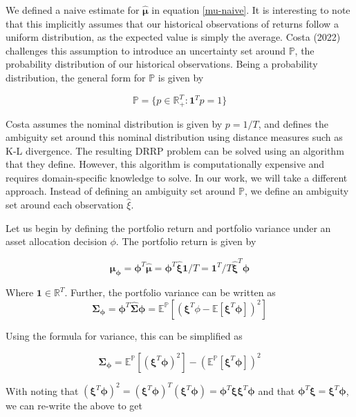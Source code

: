 \documentclass[12pt]{article}
\begin{document}
We defined a naive estimate for $\boldsymbol{\hat{\mu}}$ in equation \ref{mu-naive}. It is interesting to note that this implicitly assumes that our historical observations of returns follow a uniform distribution, as the expected value is simply the average.  Costa (2022) challenges this assumption to introduce an uncertainty set around $\mathbb{P}$, the probability distribution of our historical observations\cite{costa2022data}.  Being a probability distribution, the general form for $\mathbb{P}$ is given by

\[
\mathbb{P}= \{p\in \mathbb{R}_+^T : \boldsymbol{1}^Tp = 1\}
\]

Costa assumes the nominal distribution is given by $p = 1/T$, and defines the ambiguity set around this nominal distribution using distance measures such as K-L divergence.  The resulting DRRP problem can be solved using an algorithm that they define. However, this algorithm is computationally expensive and requires domain-specific knowledge to solve. In our work, we will take a different approach. Instead of defining an ambiguity set around $\mathbb{P}$, we define an ambiguity set around each observation $\hat{\xi}$.

Let us begin by defining the portfolio return and portfolio variance under an asset allocation decision $\phi$.  The portfolio return is given by

\[
	\boldsymbol{\mu_\phi} = \boldsymbol{\phi}^T\boldsymbol{\hat{\mu}} = \boldsymbol{\phi}^T \boldsymbol{\hat{\xi}}\boldsymbol{1}/T = \boldsymbol{1}^T/T \boldsymbol{\hat{\xi}}^T \boldsymbol{\phi}
\]

Where $\boldsymbol{1} \in \mathbb{R}^T$. Further, the portfolio variance can be written as
\[
	\boldsymbol{\Sigma_\phi} 
	= \boldsymbol{\phi}^T \boldsymbol{\hat{\Sigma}} \boldsymbol{\phi}
	= \mathbb{E}^{\mathbb{P}}[(\boldsymbol{\xi}^T\phi - \mathbb{E}[\boldsymbol{\xi}^T\boldsymbol{\phi}])^2]
\]

Using the formula for variance, this can be simplified as

\[
	\boldsymbol{\Sigma_\phi}
	= \mathbb{E}^{\mathbb{P}}[(\boldsymbol{\xi}^T \boldsymbol{\phi})^2] - (\mathbb{E}^{\mathbb{P}}[\boldsymbol{\xi}^T \boldsymbol{\phi}])^2
\]

With noting that $(\boldsymbol{\xi}^T \boldsymbol{\phi})^2 = (\boldsymbol{\xi}^T \boldsymbol{\phi})^T(\boldsymbol{\xi}^T \boldsymbol{\phi}) =\boldsymbol{\phi}^T  \boldsymbol{\xi} \boldsymbol{\xi} ^T \boldsymbol{\phi}$ and that $\boldsymbol{\phi}^T  \boldsymbol{\xi} = \boldsymbol{\xi}^T \boldsymbol{\phi} $, we can re-write the above to get
\end{document}
